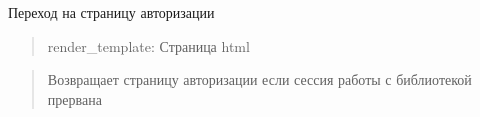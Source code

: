 \documentclass[letterpaper,10pt,russian]{sphinxmanual}
\begin{document}
\begin{fulllineitems}
\label{\detokenize{blueprints:blueprints.auth.index}}
\pysigstartsignatures
{}
\pysigstopsignatures
\sphinxAtStartPar
Переход на страницу авторизации
\begin{quote}\begin{description}
\sphinxAtStartPar
render\_template:  Страница html

\end{description}\end{quote}
\begin{description}
\begin{quote}\begin{description}
\sphinxAtStartPar
Возвращает страницу авторизации если сессия работы с библиотекой прервана

\end{description}\end{quote}

\end{description}

\end{fulllineitems}

\end{document}
